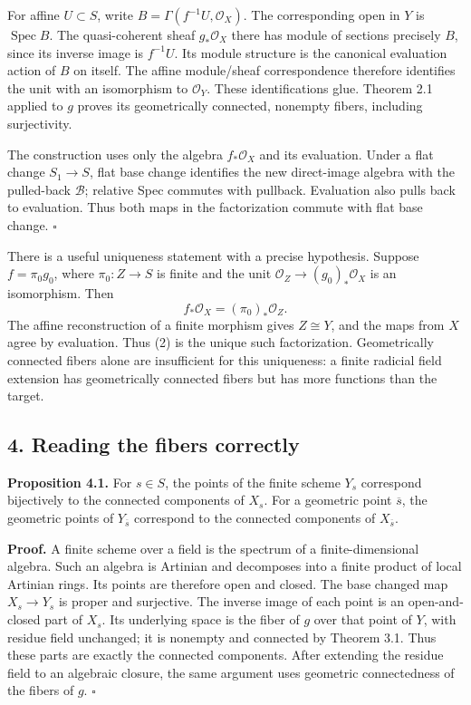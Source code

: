 \documentclass[11pt]{article}
\begin{document}
For affine \(U\subset S\), write \(B=\Gamma(f^{-1}U,\mathcal O_X)\). The
corresponding open in \(Y\) is \(\operatorname{Spec}B\). The
quasi-coherent sheaf \(g_*\mathcal O_X\) there has module of sections
precisely \(B\), since its inverse image is \(f^{-1}U\). Its module
structure is the canonical evaluation action of \(B\) on itself. The
affine module/sheaf correspondence therefore identifies the unit with an
isomorphism to \(\mathcal O_Y\). These identifications glue. Theorem 2.1
applied to \(g\) proves its geometrically connected, nonempty fibers,
including surjectivity.

The construction uses only the algebra \(f_*\mathcal O_X\) and its
evaluation. Under a flat change \(S_1\to S\), flat base change
identifies the new direct-image algebra with the pulled-back
\(\mathcal B\); relative Spec commutes with pullback. Evaluation also
pulls back to evaluation. Thus both maps in the factorization commute
with flat base change. \(\square\)

There is a useful uniqueness statement with a precise hypothesis.
Suppose \(f=\pi_0g_0\), where \(\pi_0:Z\to S\) is finite and the unit
\(\mathcal O_Z\to(g_0)_*\mathcal O_X\) is an isomorphism. Then \[
f_*\mathcal O_X=(\pi_0)_*\mathcal O_Z.
\] The affine reconstruction of a finite morphism gives \(Z\cong Y\),
and the maps from \(X\) agree by evaluation. Thus (2) is the unique such
factorization. Geometrically connected fibers alone are insufficient for
this uniqueness: a finite radicial field extension has geometrically
connected fibers but has more functions than the target.

\subsection{4. Reading the fibers
correctly}\label{reading-the-fibers-correctly}

\textbf{Proposition 4.1.} For \(s\in S\), the points of the finite
scheme \(Y_s\) correspond bijectively to the connected components of
\(X_s\). For a geometric point \(\overline s\), the geometric points of
\(Y_{\overline s}\) correspond to the connected components of
\(X_{\overline s}\).

\textbf{Proof.} A finite scheme over a field is the spectrum of a
finite-dimensional algebra. Such an algebra is Artinian and decomposes
into a finite product of local Artinian rings. Its points are therefore
open and closed. The base changed map \(X_s\to Y_s\) is proper and
surjective. The inverse image of each point is an open-and-closed part
of \(X_s\). Its underlying space is the fiber of \(g\) over that point
of \(Y\), with residue field unchanged; it is nonempty and connected by
Theorem 3.1. Thus these parts are exactly the connected components.
After extending the residue field to an algebraic closure, the same
argument uses geometric connectedness of the fibers of \(g\).
\(\square\)
\end{document}
